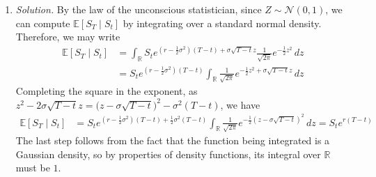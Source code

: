 \documentclass{article}
\numberwithin{equation}{section}
\begin{document}
\begin{enumerate}[label = \alph*.]
    \item
    \textit{Solution.} By the law of the unconscious statistician, since
    $ Z \sim \mathcal{N}(0, 1) $, we can compute $ \mathbb{E}[S_T \mid S_t] $
    by integrating over a standard normal density. Therefore, we may write
    \begin{equation*}
        \begin{split}
        \mathbb{E}[S_T \mid S_t] & = \int_\mathbb{R}S_te^{
            \left(r - \frac{1}{2}\sigma^2\right)(T - t) + \sigma\sqrt{T - t}z
        }\frac{1}{\sqrt{2\pi}}e^{-\frac{1}{2}z^2}\,dz \\
        & = S_te^{\left(r - \frac{1}{2}\sigma^2\right)(T - t)}
        \int_\mathbb{R}\frac{1}{\sqrt{2\pi}}e^{
            -\frac{1}{2}z^2 + \sigma\sqrt{T - t}z
        }\,dz
        \end{split}
    \end{equation*}
    Completing the square in the exponent, as $ z^2 - 2\sigma\sqrt{T - t}z =
    \big(z - \sigma\sqrt{T - t}\big)^2 - \sigma^2(T - t) $, we have
    \begin{equation*}
        \begin{split}
        \mathbb{E}[S_T \mid S_t] & = S_te^{
            \left(r - \frac{1}{2}\sigma^2\right)(T - t) +
            \frac{1}{2}\sigma^2(T - t)
        }
        \int_\mathbb{R}\frac{1}{\sqrt{2\pi}}e^{
            -\frac{1}{2}(z - \sigma\sqrt{T - t})^2
        }\,dz = S_te^{r(T - t)}
        \end{split}
    \end{equation*}
    The last step follows from the fact that the function being integrated is
    a Gaussian density, so by properties of density functions, its integral
    over $ \mathbb{R} $ must be $ 1 $.

%
%
\end{enumerate}
\end{document}
